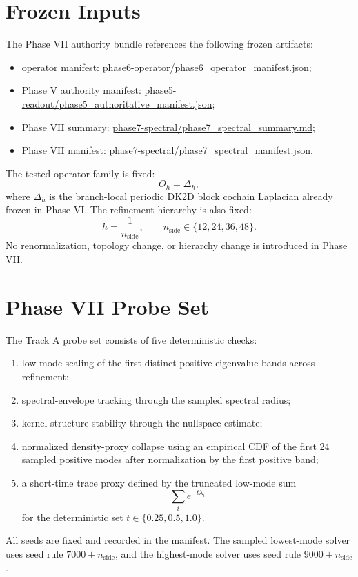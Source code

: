 \documentclass[11pt]{article}
\begin{document}
\section{Frozen Inputs}

The Phase VII authority bundle references the following frozen artifacts:
\begin{itemize}
\item operator manifest: \url{phase6-operator/phase6_operator_manifest.json};
\item Phase V authority manifest: \url{phase5-readout/phase5_authoritative_manifest.json};
\item Phase VII summary: \url{phase7-spectral/phase7_spectral_summary.md};
\item Phase VII manifest: \url{phase7-spectral/phase7_spectral_manifest.json}.
\end{itemize}

The tested operator family is fixed:
\[
O_h = \Delta_h,
\]
where $\Delta_h$ is the branch-local periodic DK2D block cochain Laplacian already frozen in Phase VI. The refinement hierarchy is also fixed:
\[
h = \frac{1}{n_{\mathrm{side}}}, \qquad n_{\mathrm{side}} \in \{12,24,36,48\}.
\]
No renormalization, topology change, or hierarchy change is introduced in Phase VII.

\section{Phase VII Probe Set}

The Track A probe set consists of five deterministic checks:
\begin{enumerate}
\item low-mode scaling of the first distinct positive eigenvalue bands across refinement;
\item spectral-envelope tracking through the sampled spectral radius;
\item kernel-structure stability through the nullspace estimate;
\item normalized density-proxy collapse using an empirical CDF of the first 24 sampled positive modes after normalization by the first positive band;
\item a short-time trace proxy defined by the truncated low-mode sum
\[
\sum_i e^{-t\lambda_i}
\]
for the deterministic set $t \in \{0.25, 0.5, 1.0\}$.
\end{enumerate}

All seeds are fixed and recorded in the manifest. The sampled lowest-mode solver uses seed rule $7000 + n_{\mathrm{side}}$, and the highest-mode solver uses seed rule $9000 + n_{\mathrm{side}}$.
\end{document}
